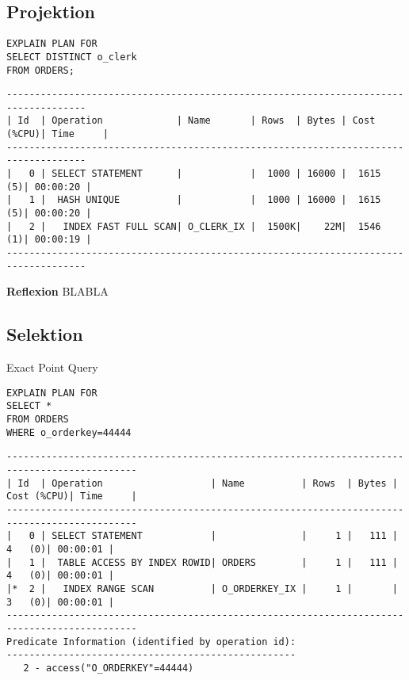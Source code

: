 \documentclass[10pt]{article}
\begin{document}
\subsection{Projektion}
\begin{lstlisting}[style=sql]
EXPLAIN PLAN FOR
SELECT DISTINCT o_clerk
FROM ORDERS;
\end{lstlisting}
\begin{lstlisting}[style=queryexecutionplan]
------------------------------------------------------------------------------------
| Id  | Operation             | Name       | Rows  | Bytes | Cost (%CPU)| Time     |
------------------------------------------------------------------------------------
|   0 | SELECT STATEMENT      |            |  1000 | 16000 |  1615   (5)| 00:00:20 |
|   1 |  HASH UNIQUE          |            |  1000 | 16000 |  1615   (5)| 00:00:20 |
|   2 |   INDEX FAST FULL SCAN| O_CLERK_IX |  1500K|    22M|  1546   (1)| 00:00:19 |
------------------------------------------------------------------------------------
\end{lstlisting}
\textbf{Reflexion} \newline
BLABLA

\subsection{Selektion}
Exact Point Query
\begin{lstlisting}[style=sql]
EXPLAIN PLAN FOR
SELECT *
FROM ORDERS
WHERE o_orderkey=44444
\end{lstlisting}
\begin{lstlisting}[style=queryexecutionplan]
---------------------------------------------------------------------------------------------
| Id  | Operation                   | Name          | Rows  | Bytes | Cost (%CPU)| Time     |
---------------------------------------------------------------------------------------------
|   0 | SELECT STATEMENT            |               |     1 |   111 |     4   (0)| 00:00:01 |
|   1 |  TABLE ACCESS BY INDEX ROWID| ORDERS        |     1 |   111 |     4   (0)| 00:00:01 |
|*  2 |   INDEX RANGE SCAN          | O_ORDERKEY_IX |     1 |       |     3   (0)| 00:00:01 |
---------------------------------------------------------------------------------------------
Predicate Information (identified by operation id):
---------------------------------------------------
   2 - access("O_ORDERKEY"=44444)
\end{lstlisting}
\end{document}
